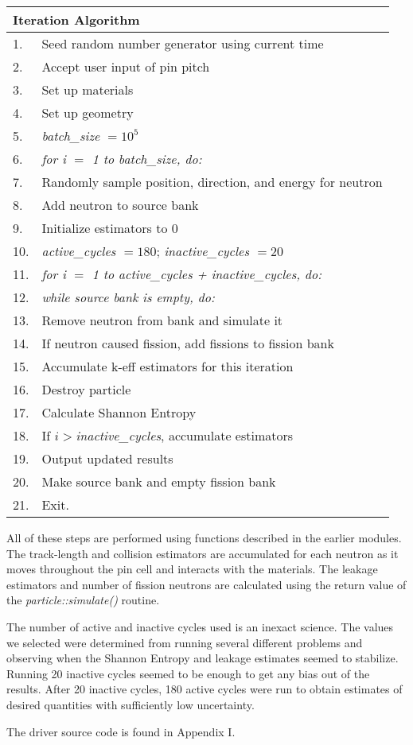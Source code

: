 \begin{center}
\begin{tabular}{l|l}
\multicolumn{2}{l}{Iteration Algorithm} \\ \hline\hline
1.  & Seed random number generator using current time \\
2.  & Accept user input of pin pitch \\
3.  & Set up materials \\
4.  & Set up geometry \\
5.  & \textit{batch{\_}size} $=10^5$ \\
6.  & \textit{for i $=$ 1 to batch{\_}size, do:} \\
7.  & \quad Randomly sample position, direction, and energy for neutron \\
8.  & \quad Add neutron to source bank \\
9.  & Initialize estimators to 0 \\
10. & \textit{active{\_}cycles $=180$}; \textit{inactive{\_}cycles $=20$} \\
11. & \textit{for i $=$ 1 to active{\_}cycles + inactive{\_}cycles, do:} \\
12. & \quad \textit{while source bank is empty, do:} \\
13. & \quad\quad Remove neutron from bank and simulate it \\
14. & \quad\quad If neutron caused fission, add fissions to fission bank \\
15. & \quad\quad Accumulate k-eff estimators for this iteration \\
16. & \quad\quad Destroy particle \\
17. & \quad Calculate Shannon Entropy \\
18. & \quad If $i > $\textit{inactive{\_}cycles}, accumulate estimators \\
19. & \quad Output updated results \\
20. & \quad Make source bank and empty fission bank \\
21. & Exit.
\end{tabular}
\end{center}

All of these steps are performed using functions described in the earlier modules.  The track-length and collision estimators are accumulated for each neutron as it moves throughout the pin cell and interacts with the materials.  The leakage estimators and number of fission neutrons are calculated using the return value of the \textit{particle::simulate()} routine.

The number of active and inactive cycles used is an inexact science.  The values we selected were determined from running several different problems and observing when the Shannon Entropy and leakage estimates seemed to stabilize.  Running 20 inactive cycles seemed to be enough to get any bias out of the results.  After 20 inactive cycles, 180 active cycles were run to obtain estimates of desired quantities with sufficiently low uncertainty.

The driver source code is found in Appendix I.

